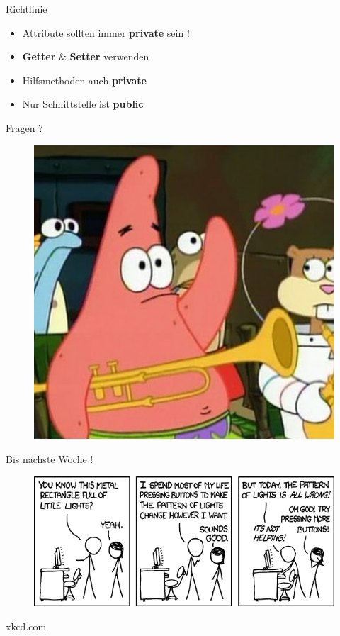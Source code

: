 \documentclass[18pt]{beamer}
\begin{document}
\begin{frame}{Richtlinie}
    \begin{itemize}
        \item Attribute sollten immer \textbf{private} sein !
        \item \textbf{Getter} \& \textbf{Setter} verwenden
        \item Hilfsmethoden auch \textbf{private}
        \item Nur Schnittstelle ist \textbf{public}
    \end{itemize}
\end{frame}


\appendix
\beginbackup

\begin{frame}{Fragen ?}
    \begin{figure}
        \includegraphics[scale=.3]{img/fragen.jpg}
    \end{figure}
\end{frame}

\begin{frame}{Bis nächste Woche !}
    \begin{figure}
        \includegraphics[scale=.5]{img/computer_problems.png}
    \end{figure}

    \begin{flushright}
    \footnotesize{xkcd.com}
    \end{flushright}
\end{frame}

\backupend
\end{document}
